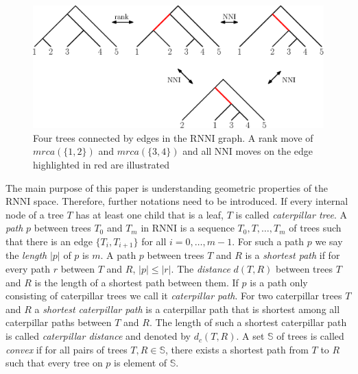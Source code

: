 \documentclass[11pt, a4paper]{article}
\newcommand{\nni}{\mathrm{NNI}}
\newcommand{\rnni}{\mathrm{RNNI}}
\begin{document}
\begin{figure}[H]
	\centering
	\includegraphics[width=\textwidth]{RNNI}
	\caption{Four trees connected by edges in the $\rnni$ graph. A rank move of $mrca(\{1,2\})$ and $mrca(\{3,4\})$ and all $\nni$ moves on the edge highlighted in red are illustrated}
	\label{fig:RNNI}
\end{figure}


The main purpose of this paper is understanding geometric properties of the $\rnni$ space.
Therefore, further notations need to be introduced.
If every internal node of a tree $T$ has at least one child that is a leaf, $T$ is called \emph{caterpillar tree}.
A \emph{path} $p$ between trees $T_0$ and $T_m$ in $\rnni$ is a sequence $T_0, T, \ldots, T_m$ of trees such that there is an edge $\{T_i, T_{i+1}\}$ for all $i=0,\ldots,m-1$.
For such a path $p$ we say the \emph{length} $|p|$ of $p$ is $m$.
A path $p$ between trees $T$ and $R$ is a \emph{shortest path} if for every path $r$ between $T$ and $R$, $|p| \leq |r|$.
The \emph{distance} $d(T,R)$ between trees $T$ and $R$ is the length of a shortest path between them.
If $p$ is a path only consisting of caterpillar trees we call it \emph{caterpillar path}.
For two caterpillar trees $T$ and $R$ a \emph{shortest caterpillar path} is a caterpillar path that is shortest among all caterpillar paths between $T$ and $R$.
The length of such a shortest caterpillar path is called \emph{caterpillar distance} and denoted by $d_c(T,R)$.
A set $\mathbb S$ of trees is called \emph{convex} if for all pairs of trees $T,R \in \mathbb S$, there exists a shortest path from $T$ to $R$ such that every tree on $p$ is element of $\mathbb S$.


\end{document}
